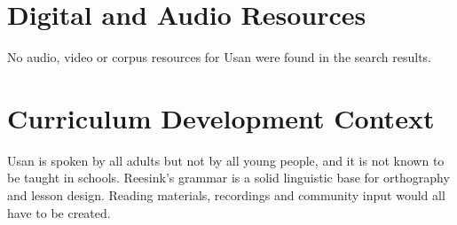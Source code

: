 \documentclass[12pt]{article}
\begin{document}
\section{Digital and Audio Resources}
No audio, video or corpus resources for Usan were found in the search results.

\section{Curriculum Development Context}
Usan is spoken by all adults but not by all young people, and it is not known to be taught in schools. Reesink's grammar is a solid linguistic base for orthography and lesson design. Reading materials, recordings and community input would all have to be created.
\end{document}
